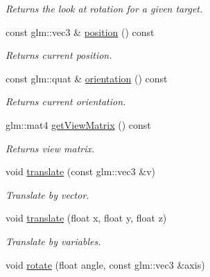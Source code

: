 \begin{DoxyCompactItemize}
\begin{DoxyCompactList}\small\item\em Returns the look at rotation for a given target. \end{DoxyCompactList}\item 
\hypertarget{class_camera_a8f86421742800785e5199421ab14587f}{const glm\+::vec3 \& \hyperlink{class_camera_a8f86421742800785e5199421ab14587f}{position} () const }\label{class_camera_a8f86421742800785e5199421ab14587f}

\begin{DoxyCompactList}\small\item\em Returns current position. \end{DoxyCompactList}\item 
\hypertarget{class_camera_ade2d43712dd19520fc16d90147cb585f}{const glm\+::quat \& \hyperlink{class_camera_ade2d43712dd19520fc16d90147cb585f}{orientation} () const }\label{class_camera_ade2d43712dd19520fc16d90147cb585f}

\begin{DoxyCompactList}\small\item\em Returns current orientation. \end{DoxyCompactList}\item 
\hypertarget{class_camera_a941940439c3704c7e5c75e6fd9fa6e7c}{glm\+::mat4 \hyperlink{class_camera_a941940439c3704c7e5c75e6fd9fa6e7c}{get\+View\+Matrix} () const }\label{class_camera_a941940439c3704c7e5c75e6fd9fa6e7c}

\begin{DoxyCompactList}\small\item\em Returns view matrix. \end{DoxyCompactList}\item 
\hypertarget{class_camera_aa00429d00bae4984467f9c5d1a3bd158}{void \hyperlink{class_camera_aa00429d00bae4984467f9c5d1a3bd158}{translate} (const glm\+::vec3 \&v)}\label{class_camera_aa00429d00bae4984467f9c5d1a3bd158}

\begin{DoxyCompactList}\small\item\em Translate by vector. \end{DoxyCompactList}\item 
\hypertarget{class_camera_ac9e53556c53beee69c77a97e2a1c1068}{void \hyperlink{class_camera_ac9e53556c53beee69c77a97e2a1c1068}{translate} (float x, float y, float z)}\label{class_camera_ac9e53556c53beee69c77a97e2a1c1068}

\begin{DoxyCompactList}\small\item\em Translate by variables. \end{DoxyCompactList}\item 
\hypertarget{class_camera_a0e6180b5a8da63a999db3de1802c8f4c}{void \hyperlink{class_camera_a0e6180b5a8da63a999db3de1802c8f4c}{rotate} (float angle, const glm\+::vec3 \&axis)}\label{class_camera_a0e6180b5a8da63a999db3de1802c8f4c}


\end{DoxyCompactItemize}
